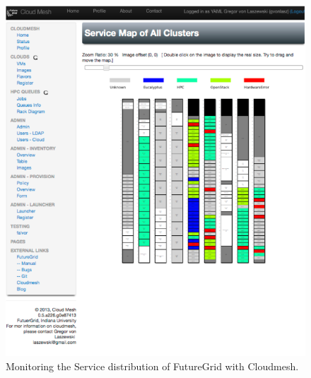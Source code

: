 \documentclass{tex/sig-alternate-2013}
\begin{document}
{\begin{figure}[htb]
  \centering
    \includegraphics[width=1.0\columnwidth]{images/rainbow.pdf}
  \caption{Monitoring the Service distribution of FutureGrid with Cloudmesh.}
\end{figure}


}
\end{document}

